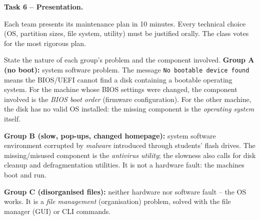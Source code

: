\documentclass[11pt]{article}
\newcounter{popsec}
\newcounter{popsub}
\newcommand{\courssub}[1]{%
  \stepcounter{popsub}%
  \par\vspace{9pt}\noindent{\popxbold\fontsize{11.5}{13}\selectfont\color{popink}{\color{poporange}\thepopsec.\thepopsub}\hspace{6pt}#1}\par\nopagebreak\vspace{4pt}
}
\begin{document}
\textbf{Task 6 -- Presentation.}\par
Each team presents its maintenance plan in 10 minutes. Every technical choice (OS, partition sizes, file system, utility) must be justified orally. The class votes for the most rigorous plan.

\courssub{Model answer}

\begin{exoresolu}
State the nature of each group's problem and the component involved.
\tcblower
\textbf{Group A (no boot):} system software problem. The message \texttt{No bootable device found} means the BIOS/UEFI cannot find a disk containing a bootable operating system. For the machine whose BIOS settings were changed, the component involved is the \emph{BIOS boot order} (firmware configuration). For the other machine, the disk has no valid OS installed: the missing component is the \emph{operating system} itself.

\textbf{Group B (slow, pop-ups, changed homepage):} system software environment corrupted by \emph{malware} introduced through students' flash drives. The missing/misused component is the \emph{antivirus utility}; the slowness also calls for disk cleanup and defragmentation utilities. It is not a hardware fault: the machines boot and run.

\textbf{Group C (disorganised files):} neither hardware nor software fault -- the OS works. It is a \emph{file management} (organisation) problem, solved with the file manager (GUI) or CLI commands.
\end{exoresolu}
\end{document}
